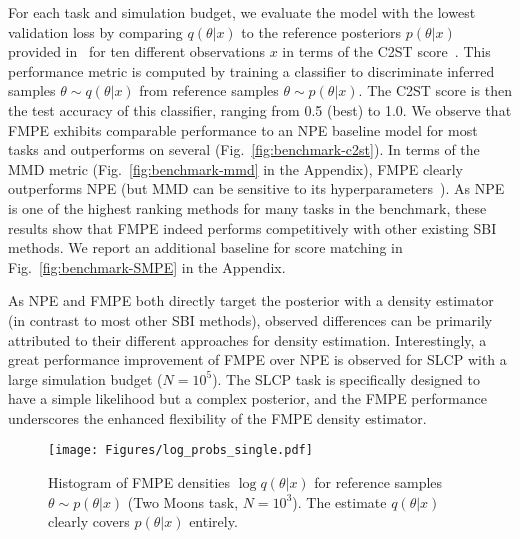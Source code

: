 \documentclass{article}
\theoremstyle{remark}
\begin{document}
For each task and simulation budget, we evaluate the model with the lowest validation loss by comparing $q(\theta|x)$ to the reference posteriors $p(\theta|x)$ provided in~\cite{lueckmann2021benchmarking} for ten different observations $x$ in terms of the C2ST score~\cite{friedman2003multivariate,lopez2016revisiting}. This performance metric is computed by training a classifier to discriminate inferred samples $\theta\sim q(\theta|x)$ from reference samples $\theta\sim p(\theta|x)$. The C2ST score is then the test accuracy of this classifier, ranging from 0.5 (best) to 1.0.  We observe that FMPE exhibits comparable performance to an NPE baseline model for most tasks and outperforms on several (Fig.~\ref{fig:benchmark-c2st}). In terms of the MMD metric (Fig.~\ref{fig:benchmark-mmd} in the Appendix), FMPE clearly outperforms NPE (but MMD can be sensitive to its hyperparameters~\cite{lueckmann2021benchmarking}). As NPE is one of the highest ranking methods for many tasks in the benchmark, these results show that FMPE indeed performs competitively with other existing SBI methods. We report an additional baseline for score matching in Fig.~\ref{fig:benchmark-SMPE} in the Appendix.


As NPE and FMPE both directly target the posterior with a density estimator (in contrast to most other SBI methods), observed differences can be primarily attributed to their different approaches for density estimation. Interestingly, a great performance improvement of FMPE over NPE is observed for SLCP with a large simulation budget ($N=10^5$). The SLCP task is specifically designed to have a simple likelihood but a complex posterior, and the FMPE performance underscores the enhanced flexibility of the FMPE density estimator.

\begin{wrapfigure}[16]{r}{0.455\textwidth}
  \vspace{-15pt}
  \centering
  \texttt{[image: Figures/log\_probs\_single.pdf]}
  \vspace{-5pt}
  \caption{\label{fig:sbibm-logprobs}
  Histogram of FMPE densities $\log q(\theta|x)$ for reference samples $\theta\sim p(\theta|x)$ (Two Moons task, $N=10^3$). The estimate $q(\theta|x)$ clearly covers $p(\theta|x)$ entirely.
  }
\end{wrapfigure}
\end{document}
